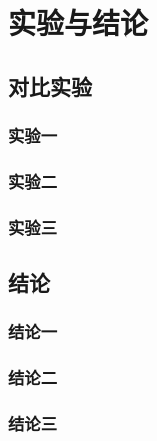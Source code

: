 \cleardoublepage

\section{实验与结论}
\subsection{对比实验}
\subsubsection{实验一}
\subsubsection{实验二}
\subsubsection{实验三}
\subsection{结论}
\subsubsection{结论一}
\subsubsection{结论二}
\subsubsection{结论三}
